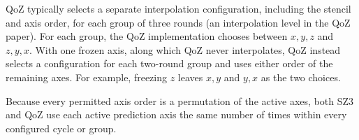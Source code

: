 QoZ typically selects a separate interpolation configuration, including the stencil and axis order, for each group of three rounds (an interpolation level in the QoZ paper). For each group, the QoZ implementation chooses between $x,y,z$ and $z,y,x$. With one frozen axis, along which QoZ never interpolates, QoZ instead selects a configuration for each two-round group and uses either order of the remaining axes. For example, freezing $z$ leaves $x,y$ and $y,x$ as the two choices.

Because every permitted axis order is a permutation of the active axes, both SZ3 and QoZ use each active prediction axis the same number of times within every configured cycle or group.
